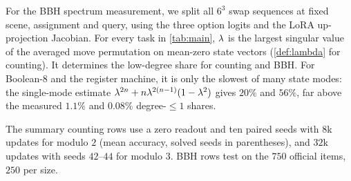 
For the BBH spectrum measurement, we split all $6^3$ swap sequences at fixed scene, assignment and query, using the three option
logits and the LoRA up-projection Jacobian. For every task in \cref{tab:main}, $\lambda$ is the largest singular value of the averaged
move permutation on mean-zero state vectors (\cref{def:lambda} for counting).
It determines the low-degree share for counting and BBH. For Boolean-8 and the register machine, it is only the slowest of many state modes:
the single-mode estimate $\lambda^{2n}+n\lambda^{2(n-1)}(1-\lambda^2)$ gives $20\%$ and $56\%$, far above the measured
$1.1\%$ and $0.08\%$ degree-$\le1$ shares.

The summary counting rows use a zero readout and ten paired seeds with $8$k updates for modulo $2$ (mean accuracy, solved seeds in parentheses),
and $32$k updates with seeds $42$--$44$ for modulo $3$. BBH rows test on the $750$ official items, $250$ per size.

\begin{table}[H]
\centering\small
{}
\caption{\textbf{Step supervision usually helps when the answer has little low-degree signal.}
Held-out accuracy (\%); ranges are over seeds. Detailed protocols and per-seed values are in the accompanying code repository.}
\label{tab:main}
\end{table}

